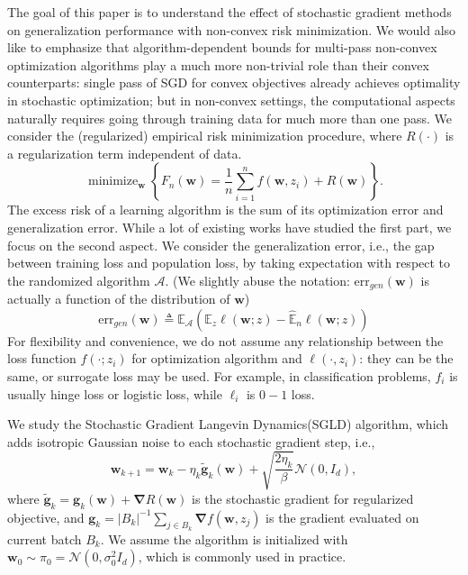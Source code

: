 \documentclass[final,12pt]{colt2018} %
\newcommand{\w}{\bm{w}}
\begin{document}
The goal of this paper is to understand the effect of stochastic gradient methods on generalization performance with non-convex risk minimization. We would also like to emphasize that algorithm-dependent bounds for multi-pass non-convex optimization algorithms play a much more non-trivial role than their convex counterparts: single pass of SGD for convex objectives already achieves optimality in stochastic optimization; but in non-convex settings, the computational aspects naturally requires going through training data for much more than one pass. We consider the (regularized) empirical risk minimization procedure, where $R(\cdot)$ is a regularization term independent of data.
\begin{equation}
\mathop{\mathrm{minimize}}_{\bm{w}}\left\{F_n(\bm{w})=\frac{1}{n}\sum_{i=1}^n f(\bm{w},z_i)+R(\bm{w})\right\}.
\end{equation}
The excess risk of a learning algorithm is the sum of its optimization error and generalization error. While a lot of existing works have studied the first part, we focus on the second aspect. We consider the generalization error, i.e., the gap between training loss and population loss, by taking expectation with respect to the randomized algorithm $\mathcal{A}$. (We slightly abuse the notation: $\mathrm{err}_{gen}(\w)$ is actually a function of the distribution of $\w$)
\begin{equation}
\mathrm{err}_{gen}(\bm{w})\triangleq\mathbb{E}_{\mathcal{A}}\left(\mathbb{E}_z \ell(\bm{w};z)-\hat{\mathbb{E}}_n \ell(\bm{w};z)\right)
\end{equation}
For flexibility and convenience, we do not assume any relationship between the loss function $f(\cdot;z_i)$ for optimization algorithm and $\ell(\cdot,z_i)$: they can be the same, or surrogate loss may be used. For example, in classification problems, $f_i$ is usually hinge loss or logistic loss, while $\ell_i$ is $0-1$ loss.

We study the Stochastic Gradient Langevin Dynamics(SGLD) algorithm, which adds isotropic Gaussian noise to each stochastic gradient step, i.e., 
\begin{equation}
  \bm{w}_{k+1}=\bm{w}_k-\eta_k\tilde{\bm{g}}_{k}(\bm{w})+\sqrt{\frac{2\eta_k}{\beta}} \mathcal{N}(0,I_d),
\end{equation}
  where $\tilde{\bm{g}}_k=\bm{g}_k(\bm{w})+\bm{\nabla}R(\bm{w})$ is the stochastic gradient for regularized objective, and $\bm{g}_k=|B_k|^{-1}\sum_{j\in B_k}\bm{\nabla}f(\bm{w},z_j)$ is the gradient evaluated on current batch $B_k$. We assume the algorithm is initialized with $\bm{w}_0\sim\pi_0=\mathcal{N}(0,\sigma_0^2I_d)$, which is commonly used in practice.
\end{document}
